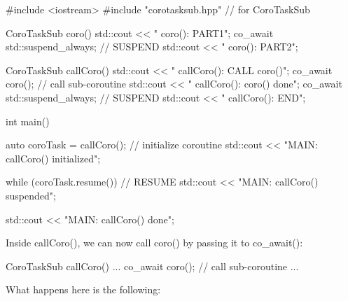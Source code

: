 \begin{cpp}
#include <iostream>
#include "corotasksub.hpp" // for CoroTaskSub

CoroTaskSub coro()
{
	std::cout << " coro(): PART1\n";
	co_await std::suspend_always{}; // SUSPEND
	std::cout << " coro(): PART2\n";
}

CoroTaskSub callCoro()
{
	std::cout << " callCoro(): CALL coro()\n";
	co_await coro(); // call sub-coroutine
	std::cout << " callCoro(): coro() done\n";
	co_await std::suspend_always{}; // SUSPEND
	std::cout << " callCoro(): END\n";
}

int main()
{
	auto coroTask = callCoro(); // initialize coroutine
	std::cout << "MAIN: callCoro() initialized\n";
	
	while (coroTask.resume()) { // RESUME
		std::cout << "MAIN: callCoro() suspended\n";
	}
	
	std::cout << "MAIN: callCoro() done\n";
}
\end{cpp}

Inside callCoro(), we can now call coro() by passing it to co\_await():

\begin{cpp}
CoroTaskSub callCoro()
{
	...
	co_await coro(); // call sub-coroutine
	...
}
\end{cpp}

What happens here is the following:

